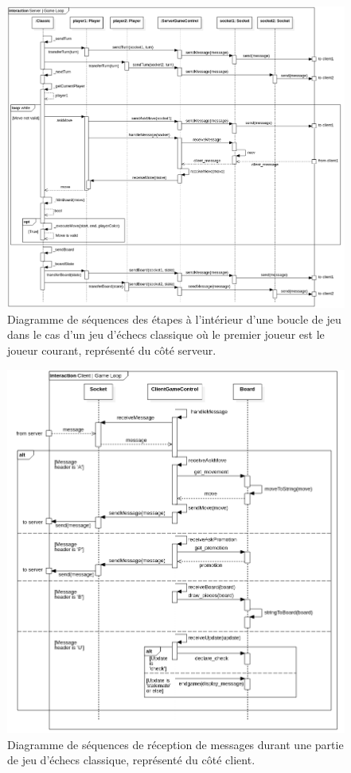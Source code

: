 \documentclass[10pt, a4paper]{article}
\begin{document}
\begin{enumerate}
\begin{figure} [H]
\centering
\includegraphics[scale=0.40]{Sequence_Server_GameLoop.png}
\caption{Diagramme de séquences des étapes à l'intérieur d'une boucle de jeu dans le cas d'un jeu d'échecs classique où le premier joueur est le joueur courant, représenté du côté serveur.}
\end{figure}

\begin{figure} [H]
\centering
\includegraphics[scale=0.40]{Sequence_Client_GameLoop.png}
\caption{Diagramme de séquences de réception de messages durant une partie de jeu d'échecs classique, représenté du côté client.}
\end{figure}


\end{enumerate}
\end{document}

